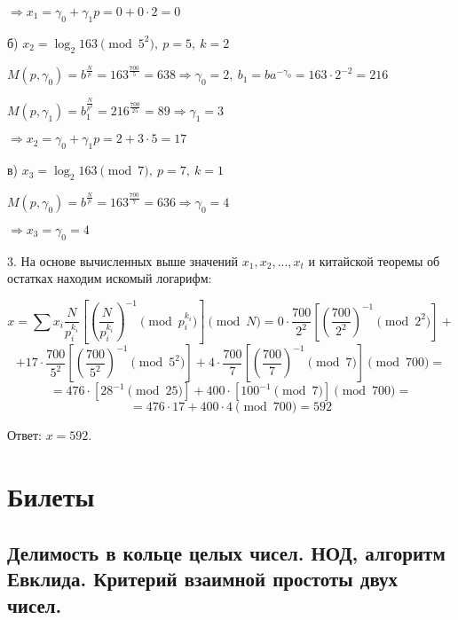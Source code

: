 \documentclass[a4paper,11pt,openany]{book}
\begin{document}
\noindent $\Rightarrow x_1 = \gamma_0 + \gamma_1 p = 0 + 0 \cdot 2 = 0$

б) $x_2 = \log_2 163 \pmod { 5^2 }, \ p = 5, \ k = 2$

\noindent $M(p, \gamma_0) = b ^ { \frac{N}{p} } = 163 ^ { \frac{700}{5} } = 638 \Rightarrow \gamma_0 = 2, \ b_1 = ba^{-\gamma_0} = 163 \cdot 2 ^ {-2} = 216$

\noindent $M(p, \gamma_1) = b_1 ^ { \frac{N}{p^2} } = 216 ^ { \frac{700}{25} } = 89 \Rightarrow \gamma_1 = 3$

\noindent $\Rightarrow x_2 = \gamma_0 + \gamma_1 p = 2 + 3 \cdot 5 = 17$

в) $x_3 = \log_2 163 \pmod { 7 }, \ p = 7, \ k = 1$

\noindent $M(p, \gamma_0) = b ^ { \frac{N}{p} } = 163 ^ { \frac{700}{7} } = 636 \Rightarrow \gamma_0 = 4$

\noindent $\Rightarrow x_3 = \gamma_0 = 4$

3. На основе вычисленных выше значений $x_1, x_2, ..., x_t$ и китайской теоремы об остатках находим искомый логарифм:

$$x = \sum x_i \frac{N}{p_i^{k_i}} [ ( \frac{N}{p_i^{k_i}} ) ^ {-1} \!\!\!\!\pmod {p_i^{k_i}} ] \!\!\!\!\pmod N = 0 \cdot \frac{700}{2^2} [ (\frac{700}{2^2}) ^ {-1} \!\!\!\!\pmod {2^2}] + $$ 
$$+ 17 \cdot \frac{700}{5^2} [ (\frac{700}{5^2}) ^ {-1} \!\!\!\!\pmod {5^2}] + 4 \cdot \frac{700}{7} [ (\frac{700}{7}) ^ {-1} \!\!\!\!\pmod 7]  \pmod {700} = $$
$$ = 476 \cdot [ 28 ^ {-1} \!\!\!\!\pmod {25}] + 400 \cdot [100 ^ {-1} \!\!\!\!\pmod 7] \pmod {700} = $$
$$ = 476 \cdot 17 + 400 \cdot 4 \pmod {700} = 592$$

\noindent Ответ: $x = 592$.

\section{}

\chapter{Билеты}
\section{Делимость в кольце целых чисел. НОД, алгоритм Евклида. Критерий взаимной простоты двух чисел.}

\end{document}
